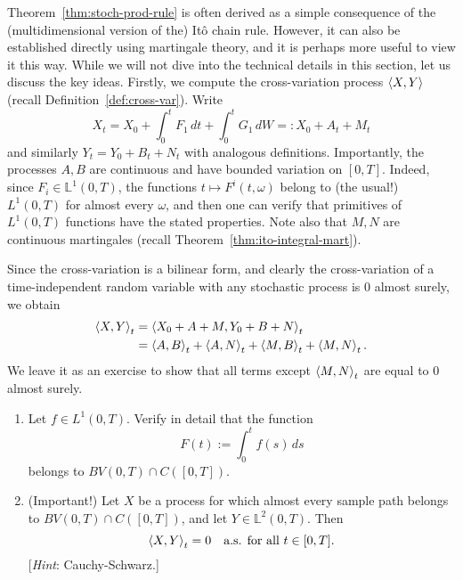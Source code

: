 Theorem~\ref{thm:stoch-prod-rule} is often derived as a simple consequence of the (multidimensional version of the) It\^{o} chain rule. However, it can also be established directly using martingale theory, and it is perhaps more useful to view it this way. While we will not dive into the technical details in this section, let us discuss the key ideas. Firstly, we compute the cross-variation process $\braket{X,Y}$ (recall Definition~\ref{def:cross-var}). Write 
\begin{equation*}
    X_t = X_0 + \int_0^t F_1\,dt + \int_0^t G_1\,dW =: X_0 + A_t + M_t
\end{equation*}
and similarly $Y_t = Y_0 + B_t + N_t$ with analogous definitions. Importantly, the processes $A,B$ are continuous and have bounded variation on $[0,T]$. Indeed, since $F_i\in\mathbb{L}^1(0,T)$, the functions $t\mapsto F^i(t,\omega)$ belong to (the usual!) $L^1(0,T)$ for almost every $\omega$, and then one can verify that primitives of $L^1(0,T)$ functions have the stated properties. Note also that $M, N$ are continuous martingales (recall Theorem~\ref{thm:ito-integral-mart}).

Since the cross-variation is a bilinear form, and clearly the cross-variation of a time-independent random variable with any stochastic process is $0$ almost surely, we obtain
\begin{align*}
    \braket{X,Y}_t &= \braket{X_0+A+M,Y_0+B+N}_t \\
    &= \braket{A,B}_t + \braket{A,N}_t + \braket{M,B}_t + \braket{M,N}_t.
\end{align*}
We leave it as an exercise to show that all terms except $\braket{M,N}_t$ are equal to $0$ almost surely.

\begin{exercise}
\label{exer:quad-var-BV}
\begin{enumerate}[\upshape (i)]
    \item Let $f\in L^1(0,T)$. Verify in detail that the function
    \begin{equation*}
        F(t) := \int_0^t f(s)\,ds
    \end{equation*}
    belongs to $BV(0,T)\cap C([0,T])$.

    \item (Important!) Let $X$ be a process for which almost every sample path belongs to $BV(0,T)\cap C([0,T])$, and let $Y\in\mathbb{L}^2(0,T)$. Then
    \begin{equation*}
        \braket{X,Y}_t = 0 \quad\text{a.s. for all } t\in [0,T].
    \end{equation*}
    [\emph{Hint}: Cauchy-Schwarz.]
\end{enumerate}
\end{exercise}

